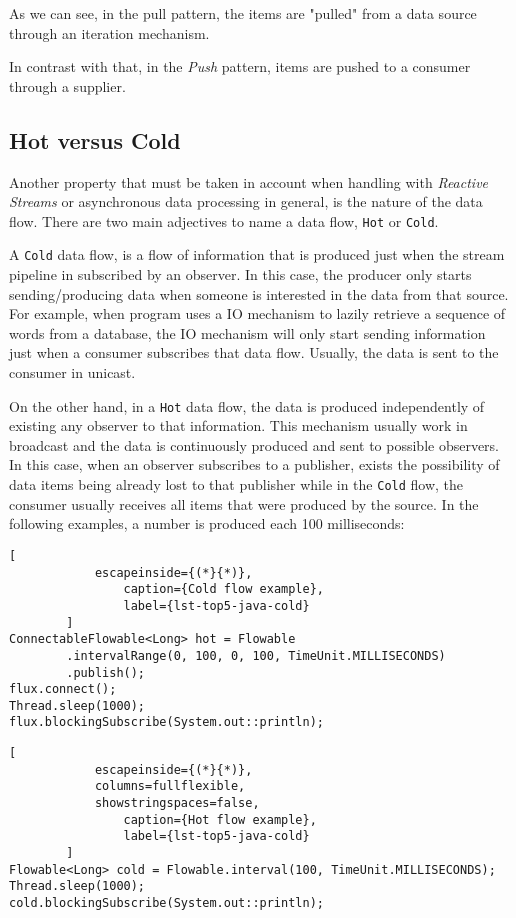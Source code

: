 	As we can see, in the pull pattern, the items are "pulled" from a data source through an iteration mechanism. 
	
	In contrast with that, in the \textit{Push} pattern, items are pushed to a consumer through a supplier.


	\subsection{Hot versus Cold}
	
	Another property that must be taken in account when handling with \textit{Reactive Streams} or asynchronous data processing in general, is the nature of the data flow. 
	There are two main adjectives to name a data flow, \texttt{Hot} or \texttt{Cold}. 

	A \texttt{Cold} data flow, is a flow of information that is produced just when the stream pipeline in subscribed by an observer. In this case, the producer only starts sending/producing data when someone is interested in the data from that source. 
	For example, when program uses a IO mechanism to lazily retrieve a sequence of words from a database, the IO mechanism will only start sending information just when a consumer subscribes that data flow. Usually, the data is sent to the consumer in unicast.
	
	On the other hand, in a \texttt{Hot} data flow, the data is produced independently of existing any observer to that information. This mechanism usually work in broadcast and the data is continuously produced and sent to possible observers.
	In this case, when an observer subscribes to a publisher, exists the possibility of data items being already lost to that publisher while in the \texttt{Cold} flow, the consumer usually receives all items that were produced by the source.
	In the following examples, a number is produced each 100 milliseconds:


	\begin{center}
		\lstset{basicstyle=\scriptsize\ttfamily,frame=bottomline}
		\begin{minipage}[t][][b]{.46\textwidth}
		\begin{lstlisting}[
			escapeinside={(*}{*)},
				caption={Cold flow example},
				label={lst-top5-java-cold}
		]
ConnectableFlowable<Long> hot = Flowable
		.intervalRange(0, 100, 0, 100, TimeUnit.MILLISECONDS)
		.publish();
flux.connect(); 
Thread.sleep(1000);
flux.blockingSubscribe(System.out::println);
		\end{lstlisting}
		\end{minipage}
		\hfill
		\begin{minipage}{.48\textwidth}
		\lstset{basicstyle=\scriptsize\ttfamily,frame=bottomline}
		\begin{lstlisting}[
			escapeinside={(*}{*)},
			columns=fullflexible,
			showstringspaces=false,
				caption={Hot flow example},
				label={lst-top5-java-cold}
		]
Flowable<Long> cold = Flowable.interval(100, TimeUnit.MILLISECONDS);
Thread.sleep(1000);
cold.blockingSubscribe(System.out::println); 

		\end{lstlisting}
		\end{minipage}
	\end{center}


